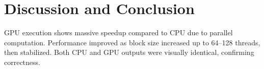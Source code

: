 \documentclass[hidelinks,12pt,a4paper]{article}
\begin{document}
\section{Discussion and Conclusion}
GPU execution shows massive speedup compared to CPU due to parallel computation.  
Performance improved as block size increased up to 64–128 threads, then stabilized.  
Both CPU and GPU outputs were visually identical, confirming correctness.  
\end{document}
